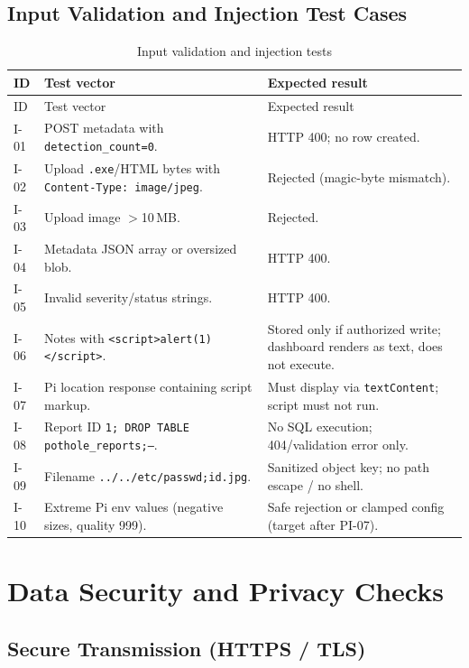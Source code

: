 \documentclass[12pt]{article}
\newcommand{\toprule}{\hline}
\newcommand{\midrule}{\hline}
\newcommand{\bottomrule}{\hline}
\begin{document}
\subsection{Input Validation and Injection Test Cases}

\begin{longtable}{p{}p{}p{}}
\caption{Input validation and injection tests}\label{tab:inject-tests}\\
\toprule
ID & Test vector & Expected result \\
\midrule
\endfirsthead
\toprule
ID & Test vector & Expected result \\
\midrule
\endhead
I-01 & POST metadata with \texttt{detection\_count=0}. & HTTP 400; no row created. \\
I-02 & Upload \texttt{.exe}/HTML bytes with \texttt{Content-Type: image/jpeg}. & Rejected (magic-byte mismatch). \\
I-03 & Upload image $>$10\,MB. & Rejected. \\
I-04 & Metadata JSON array or oversized blob. & HTTP 400. \\
I-05 & Invalid severity/status strings. & HTTP 400. \\
I-06 & Notes with \texttt{<script>alert(1)</script>}. & Stored only if authorized write; dashboard renders as text, does not execute. \\
I-07 & Pi location response containing script markup. & Must display via \texttt{textContent}; script must not run. \\
I-08 & Report ID \texttt{1; DROP TABLE pothole\_reports;--}. & No SQL execution; 404/validation error only. \\
I-09 & Filename \texttt{../../etc/passwd;id.jpg}. & Sanitized object key; no path escape / no shell. \\
I-10 & Extreme Pi env values (negative sizes, quality 999). & Safe rejection or clamped config (target after PI-07). \\
\bottomrule
\end{longtable}

\section{Data Security and Privacy Checks}
\label{sec:data}

\subsection{Secure Transmission (HTTPS / TLS)}
\end{document}

